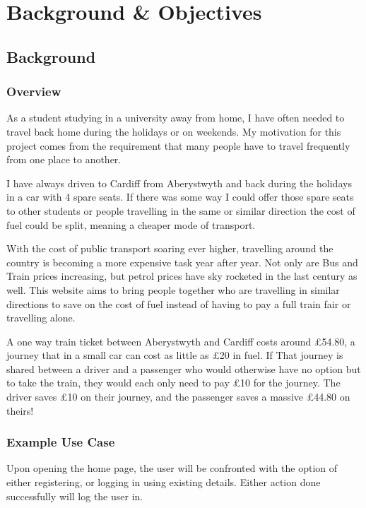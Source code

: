 \chapter{Background \& Objectives}
\section{Background}
\subsection{Overview}
As a student studying in a university away from home, I have often needed to travel back home during the holidays or on weekends. My motivation for this project comes from the requirement that many people have to travel frequently from one place to another. 

I have always driven to Cardiff from Aberystwyth and back during the holidays in a car with 4 spare seats. If there was some way I could offer those spare seats to other students or people travelling in the same or similar direction the cost of fuel could be split, meaning a cheaper mode of transport.

With the cost of public transport soaring ever higher\cite{gov_public_transport_doc}, travelling around the country is becoming a more expensive task year after year. Not only are Bus and Train prices increasing, but petrol prices have sky rocketed in the last century\cite{guardian_fuel_prices} as well. This website aims to bring people together who are travelling in similar directions to save on the cost of fuel instead of having to pay a full train fair or travelling alone. 

A one way train ticket between Aberystwyth and Cardiff costs around \pounds 54.80\cite{trainline_aber_cardiff_price}, a journey that in a small car can cost as little as \pounds 20 in fuel. If That journey is shared between a driver and a passenger who would otherwise have no option but to take the train, they would each only need to pay \pounds 10 for the journey. The driver saves \pounds 10 on their journey, and the passenger saves a massive \pounds 44.80 on theirs!


\subsection{Example Use Case}
	Upon opening the home page, the user will be confronted with the option of either registering, or logging in using existing details. Either action done successfully will log the user in.
	
